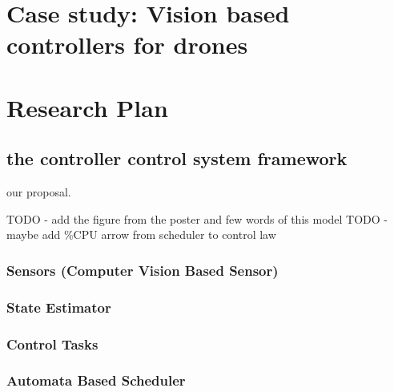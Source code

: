 \documentclass[11pt]{article}
\begin{document}
\section{Case study: Vision based controllers for drones}



\section{Research Plan}






\subsection{the controller control system framework}
our proposal.

TODO - add the figure from the poster and few words of this model
TODO - maybe add \%CPU arrow from scheduler to control law 

\subsubsection{Sensors (Computer Vision Based Sensor)}
\subsubsection{State Estimator}
\subsubsection{Control Tasks}
\subsubsection{Automata Based Scheduler}
\end{document}
